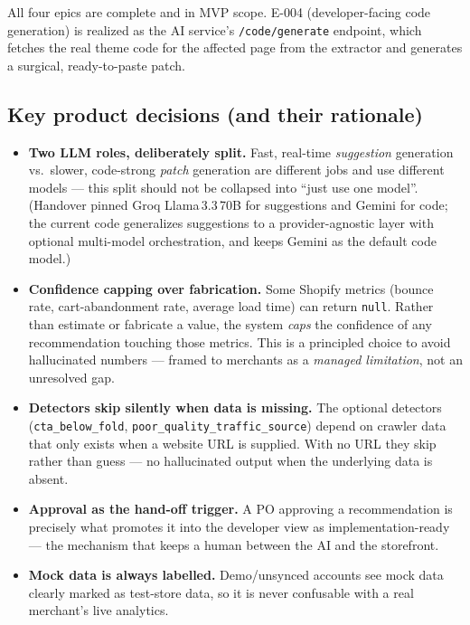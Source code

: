 \documentclass[11pt,a4paper]{article}
\begin{document}
All four epics are complete and in MVP scope. E-004 (developer-facing code
generation) is realized as the AI service's \texttt{/code/generate} endpoint,
which fetches the real theme code for the affected page from the extractor and
generates a surgical, ready-to-paste patch.

\subsection{Key product decisions (and their rationale)}

\begin{itemize}[leftmargin=1.4em]
  \item \textbf{Two LLM roles, deliberately split.} Fast, real-time
  \emph{suggestion} generation vs.\ slower, code-strong \emph{patch}
  generation are different jobs and use different models --- this split should
  not be collapsed into ``just use one model''. (Handover pinned Groq
  Llama\,3.3\,70B for suggestions and Gemini for code; the current code
  generalizes suggestions to a provider-agnostic layer with optional
  multi-model orchestration, and keeps Gemini as the default code model.)
  \item \textbf{Confidence capping over fabrication.} Some Shopify metrics
  (bounce rate, cart-abandonment rate, average load time) can return
  \texttt{null}. Rather than estimate or fabricate a value, the system
  \emph{caps} the confidence of any recommendation touching those metrics. This
  is a principled choice to avoid hallucinated numbers --- framed to merchants
  as a \emph{managed limitation}, not an unresolved gap.
  \item \textbf{Detectors skip silently when data is missing.} The optional
  detectors (\texttt{cta\_below\_fold}, \texttt{poor\_quality\_traffic\_source})
  depend on crawler data that only exists when a website URL is supplied. With
  no URL they skip rather than guess --- no hallucinated output when the
  underlying data is absent.
  \item \textbf{Approval as the hand-off trigger.} A PO approving a
  recommendation is precisely what promotes it into the developer view as
  implementation-ready --- the mechanism that keeps a human between the AI and
  the storefront.
  \item \textbf{Mock data is always labelled.} Demo/unsynced accounts see mock
  data clearly marked as test-store data, so it is never confusable with a real
  merchant's live analytics.
\end{itemize}
\end{document}

